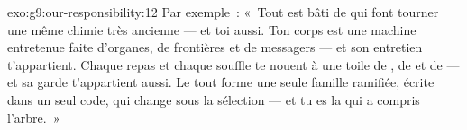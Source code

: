 \begin{solution}{exo:g9:our-responsibility:12}
Par exemple~: «~Tout  est bâti de  qui
font tourner une même chimie très ancienne --- et toi
aussi. Ton corps est une machine entretenue faite d'organes,
de frontières et de messagers --- et son entretien
t'appartient. Chaque repas et chaque souffle te nouent à une
toile de , de  et de 
--- et sa garde t'appartient aussi. Le tout forme une seule
famille ramifiée, écrite dans un seul code, qui change sous
la sélection --- et tu es la  qui a compris
l'arbre.~»
\end{solution}

